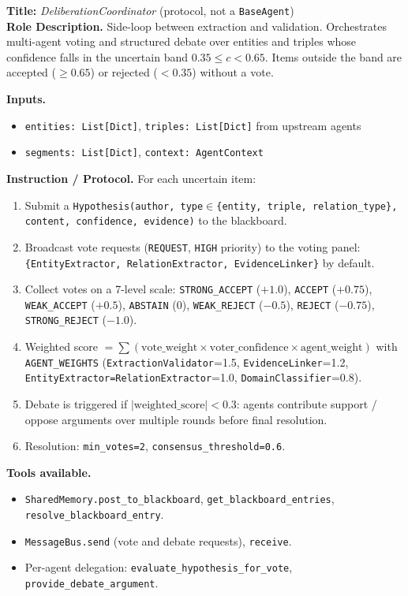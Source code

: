 \documentclass{article}
\begin{document}
\begin{agentbox}
\textbf{Title:} \textit{DeliberationCoordinator} (protocol, not a \texttt{BaseAgent})\\
\textbf{Role Description.} Side-loop between extraction and validation.
Orchestrates multi-agent voting and structured debate over
entities and triples whose confidence falls in the uncertain band
$0.35 \le c < 0.65$. Items outside the band are accepted ($\ge 0.65$)
or rejected ($<0.35$) without a vote.

\textbf{Inputs.}
\begin{itemize}[leftmargin=*,nosep]
\item \texttt{entities: List[Dict]}, \texttt{triples: List[Dict]} from upstream agents
\item \texttt{segments: List[Dict]}, \texttt{context: AgentContext}
\end{itemize}

\textbf{Instruction / Protocol.} For each uncertain item:
\begin{enumerate}[leftmargin=*,nosep]
\item Submit a \texttt{Hypothesis(author, type$\in$\{entity, triple, relation\_type\}, content, confidence, evidence)} to the blackboard.
\item Broadcast vote requests (\texttt{REQUEST}, \texttt{HIGH} priority) to the voting panel: \texttt{\{EntityExtractor, RelationExtractor, EvidenceLinker\}} by default.
\item Collect votes on a 7-level scale: \texttt{STRONG\_ACCEPT} ($+1.0$), \texttt{ACCEPT} ($+0.75$), \texttt{WEAK\_ACCEPT} ($+0.5$), \texttt{ABSTAIN} ($0$), \texttt{WEAK\_REJECT} ($-0.5$), \texttt{REJECT} ($-0.75$), \texttt{STRONG\_REJECT} ($-1.0$).
\item Weighted score $= \sum (\text{vote\_weight} \times \text{voter\_confidence} \times \text{agent\_weight})$ with \texttt{AGENT\_WEIGHTS} (\texttt{ExtractionValidator}=1.5, \texttt{EvidenceLinker}=1.2, \texttt{EntityExtractor=RelationExtractor}=1.0, \texttt{DomainClassifier}=0.8).
\item Debate is triggered if $|\text{weighted\_score}| < 0.3$: agents contribute support / oppose arguments over multiple rounds before final resolution.
\item Resolution: \texttt{min\_votes=2}, \texttt{consensus\_threshold=0.6}.
\end{enumerate}

\textbf{Tools available.}
\begin{itemize}[leftmargin=*,nosep]
\item \texttt{SharedMemory.post\_to\_blackboard}, \texttt{get\_blackboard\_entries}, \texttt{resolve\_blackboard\_entry}.
\item \texttt{MessageBus.send} (vote and debate requests), \texttt{receive}.
\item Per-agent delegation: \texttt{evaluate\_hypothesis\_for\_vote}, \texttt{provide\_debate\_argument}.
\end{itemize}


\end{agentbox}
\end{document}
